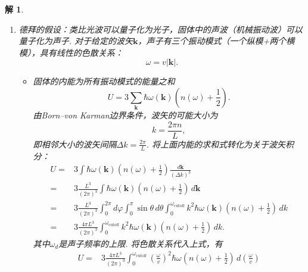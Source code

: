 \documentclass[UTF8,10pt,a4paper]{article}
\theoremstyle{Problem}
\theoremstyle{Solution}
\newtheorem*{sol}{解}
\begin{document}
\begin{sol}
    \begin{enumerate}
        \item[(a)] 德拜的假设：类比光波可以量子化为光子，固体中的声波（机械振动波）可以量子化为声子. 对于给定的波矢$\bm{k}$，声子有三个振动模式（一个纵模+两个横模），具有线性的色散关系：
        \begin{equation}
            \omega=v|\bm{k}|.
        \end{equation}
              \begin{itemize}
                  \item[$\triangleright$] 固体的内能为所有振动模式的能量之和
                        \begin{equation}
                            U=3\sum_{\bm{k}}\hbar\omega(\bm{k})\left(n(\omega)+\frac{1}{2}\right).
                        \end{equation}
                        由Born–von Karman边界条件，波矢的可能大小为
                        \begin{equation}
                            k=\frac{2\pi n}{L},
                        \end{equation}
                        即相邻大小的波矢间隔$\Delta k=\frac{2\pi}{L}$.
                        将上面内能的求和式转化为关于波矢积分：
                        \begin{align}
                            \nonumber U= & 3\int\hbar\omega(\bm{k})\left(n(\omega)+\frac{1}{2}\right)\frac{d\bm{k}}{(\Delta k)^3}                                                                                \\
                            \nonumber=   & 3\frac{L^3}{(2\pi)^3}\int\hbar\omega(\bm{k})\left(n(\omega)+\frac{1}{2}\right)\,d\bm{k}                                                                               \\
                            \nonumber=   & 3\frac{L^3}{(2\pi)^3}\int_0^{2\pi} d\varphi\int_0^{\pi}\sin\theta\,d\theta\int_0^{\omega_{\text{cutoff}}}k^2\hbar\omega(\bm{k})\left(n(\omega)+\frac{1}{2}\right)\,dk \\
                            =            & 3\frac{4\pi L^3}{(2\pi)^3}\int_0^{\omega_{\text{cutoff}}}k^2\hbar\omega(\bm{k})\left(n(\omega)+\frac{1}{2}\right)\,dk.
                        \end{align}
                        其中$\omega_d$是声子频率的上限. 将色散关系代入上式，有
                        \begin{align}
                            \nonumber U= & 3\frac{4\pi L^3}{(2\pi)^3}\int_0^{\omega_{\text{cutoff}}}\left(\frac{\omega}{v}\right)^2\hbar\omega\left(n(\omega)+\frac{1}{2}\right)\,d\left(\frac{\omega}{v}\right) \\

\end{align}
\end{itemize}
\end{enumerate}
\end{sol}
\end{document}
